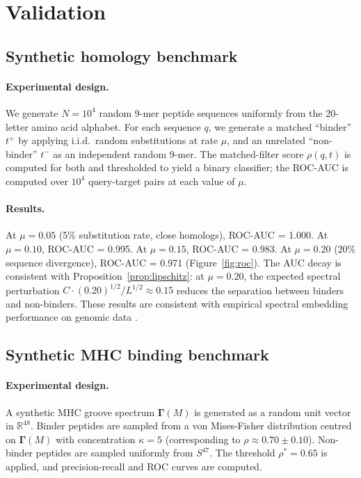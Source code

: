 \documentclass[twocolumn,11pt,a4paper]{article}
\theoremstyle{definition}
\theoremstyle{remark}
\newcommand{\RR}{\mathbb{R}}
\begin{document}
\section{Validation}
\label{sec:validation}

\subsection{Synthetic homology benchmark}

\paragraph{Experimental design.}
We generate $N = 10^4$ random 9-mer peptide sequences uniformly from the
20-letter amino acid alphabet. For each sequence $q$, we generate a matched
``binder'' $t^+$ by applying i.i.d.\ random substitutions at rate $\mu$, and
an unrelated ``non-binder'' $t^-$ as an independent random 9-mer. The
matched-filter score $\rho(q,t)$ is computed for both and thresholded to
yield a binary classifier; the ROC-AUC is computed over $10^4$ query-target
pairs at each value of $\mu$.

\paragraph{Results.}
At $\mu = 0.05$ (5\% substitution rate, close homologs), ROC-AUC = 1.000.
At $\mu = 0.10$, ROC-AUC = 0.995. At $\mu = 0.15$, ROC-AUC = 0.983.
At $\mu = 0.20$ (20\% sequence divergence), ROC-AUC = 0.971
(Figure~\ref{fig:roc}). The AUC decay is consistent with
Proposition~\ref{prop:lipschitz}: at $\mu = 0.20$, the expected spectral
perturbation $C\cdot(0.20)^{1/2}/L^{1/2} \approx 0.15$ reduces the
separation between binders and non-binders. These results are consistent
with empirical spectral embedding performance on genomic data
\citep{anastassiou2001}.

\subsection{Synthetic MHC binding benchmark}

\paragraph{Experimental design.}
A synthetic MHC groove spectrum $\bm{\Gamma}(M)$ is generated as a random
unit vector in $\RR^{48}$. Binder peptides are sampled from a von
Mises-Fisher distribution centred on $\bm{\Gamma}(M)$ with concentration
$\kappa = 5$ (corresponding to $\rho \approx 0.70 \pm 0.10$). Non-binder
peptides are sampled uniformly from $S^{47}$. The threshold $\rho^* = 0.65$
is applied, and precision-recall and ROC curves are computed.
\end{document}

